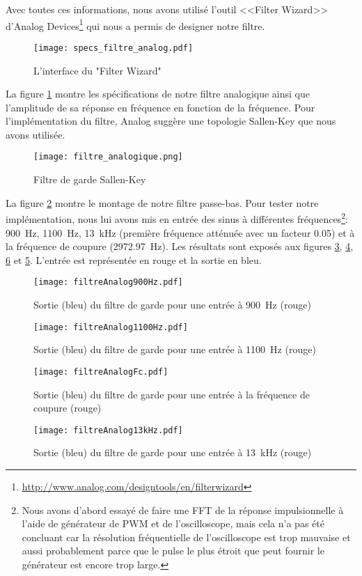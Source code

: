 Avec toutes ces informations, nous avons utilisé l'outil <<Filter Wizard>> d'Analog Devices\footnote{\url{http://www.analog.com/designtools/en/filterwizard}} qui nous a permis de designer notre filtre.
\begin{figure}[htbp]
\centering
\texttt{[image: specs\_filtre\_analog.pdf]}
\caption{L'interface du "Filter Wizard"}
\label{fig:specsAnalogFilter}
\end{figure}
La figure \ref{fig:specsAnalogFilter} montre les spécifications de notre filtre analogique ainsi que l'amplitude de sa réponse en fréquence en fonction de la fréquence. Pour l'implémentation du filtre, Analog suggère une topologie Sallen-Key que nous avons utilisée.
\begin{figure}[htbp]
\centering
\texttt{[image: filtre\_analogique.png]}
\caption{Filtre de garde Sallen-Key}
\label{fig:filtreAnalogique}
\end{figure}
La figure \ref{fig:filtreAnalogique} montre le montage de notre filtre passe-bas. Pour tester notre implémentation, nous lui avons mis en entrée des sinus à différentes fréquences\footnote{Nous avons d'abord essayé de faire une FFT de la réponse impulsionnelle à l'aide de générateur de PWM et de l'oscilloscope, mais cela n'a pas été concluant car la résolution fréquentielle de l'oscilloscope est trop mauvaise et aussi probablement parce que le pulse le plus étroit que peut fournir le générateur est encore trop large.}: \SI{900}{\hertz}, \SI{1100}{\hertz}, \SI{13}{\kilo\hertz} (première fréquence atténuée avec un facteur 0.05) et à la fréquence de coupure (\SI{2972.97}{\hertz}). Les résultats sont exposés aux figures \ref{fig:filtreAnalog900Hz}, \ref{fig:filtreAnalog1100Hz}, \ref{fig:filtreAnalog13kHz} et \ref{fig:filtreAnalogFc}. L'entrée est représentée en rouge et la sortie en bleu.
\begin{figure}[htbp]
\centering
\texttt{[image: filtreAnalog900Hz.pdf]}
\caption{Sortie (bleu) du filtre de garde pour une entrée à \SI{900}{\hertz} (rouge)}
\label{fig:filtreAnalog900Hz}
\end{figure}
\begin{figure}[htbp]
\centering
\texttt{[image: filtreAnalog1100Hz.pdf]}
\caption{Sortie (bleu) du filtre de garde pour une entrée à \SI{1100}{\hertz} (rouge)}
\label{fig:filtreAnalog1100Hz}
\end{figure}
\begin{figure}[htbp]
\centering
\texttt{[image: filtreAnalogFc.pdf]}
\caption{Sortie (bleu) du filtre de garde pour une entrée à la fréquence de coupure (rouge)}
\label{fig:filtreAnalogFc}
\end{figure}
\begin{figure}[htbp]
\centering
\texttt{[image: filtreAnalog13kHz.pdf]}
\caption{Sortie (bleu) du filtre de garde pour une entrée à \SI{13}{\kilo\hertz} (rouge)}
\label{fig:filtreAnalog13kHz}
\end{figure}

